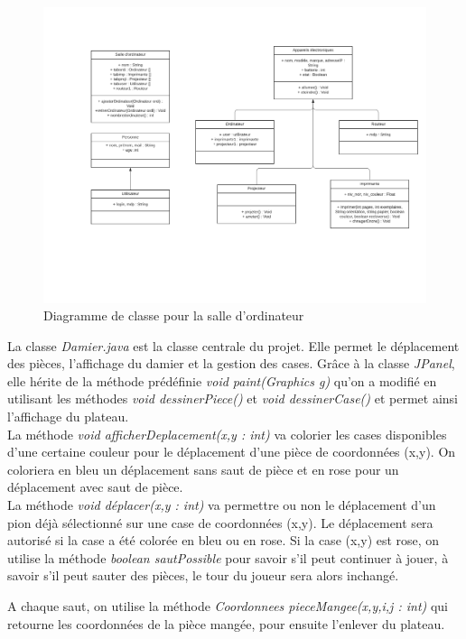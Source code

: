 \documentclass[12,french]{report}
\begin{document}
\begin{figure}[H]
	\center
	\includegraphics[width=1\textwidth]{./Images/UML}
	\caption{Diagramme de classe pour la salle d'ordinateur}
\end{figure}\vspace{0.2cm}


La classe \textit{Damier.java} est la classe centrale du projet. Elle permet le déplacement des pièces, l'affichage du damier et la gestion des cases. Grâce à la classe \textit{JPanel}, elle hérite de la méthode prédéfinie \textit{void paint(Graphics g)} qu'on a modifié en utilisant les méthodes \textit{void dessinerPiece()} et \textit{void dessinerCase()} et permet ainsi l'affichage du plateau.\\

La méthode \textit{void afficherDeplacement(x,y : int)} va colorier les cases disponibles d'une certaine couleur pour le déplacement d'une pièce de coordonnées (x,y). On coloriera en bleu un déplacement sans saut de pièce et en rose pour un déplacement avec saut de pièce.\\

La méthode \textit{void déplacer(x,y : int)} va permettre ou non le déplacement d'un pion déjà sélectionné sur une case de coordonnées (x,y). Le déplacement sera autorisé si la case a été colorée en bleu ou en rose. Si la case (x,y) est rose, on utilise la méthode \textit{boolean sautPossible} pour savoir s'il peut continuer à jouer, à savoir s'il peut sauter des pièces, le tour du joueur sera alors inchangé.

A chaque saut, on utilise la méthode \textit{Coordonnees pieceMangee(x,y,i,j : int)} qui retourne les coordonnées de la pièce mangée, pour ensuite l'enlever du plateau.\\
\end{document}
